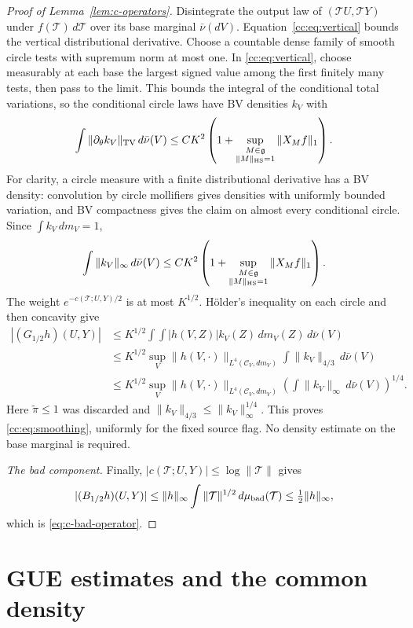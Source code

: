 \documentclass[11pt]{article}
\numberwithin{equation}{section}
\theoremstyle{remark}
\begin{document}
\begin{proof}[Proof of Lemma~\ref{lem:c-operators}]
Disintegrate the output law of $(\mathcal T U,\mathcal T Y)$ under $f(\mathcal T)\,d\mathcal T$ over
its base marginal $\bar\nu(dV)$. Equation~\eqref{cc:eq:vertical}
bounds the vertical distributional derivative. Choose a countable
dense family of smooth circle tests with supremum norm at most one.
In \eqref{cc:eq:vertical}, choose measurably at each base the largest
signed value among the first finitely many tests, then pass to the
limit. This bounds the integral of the conditional total variations,
so the conditional circle laws have BV densities $k_V$ with
\[
 \int\|\partial_\theta k_V\|_{\rm TV}\,d\bar\nu(V)
 \le CK^2\left(1+
 \sup_{\substack{M\in\mathfrak g\\\|M\|_{\rm HS}=1}}
                \|X_Mf\|_1\right).
\]
For clarity, a circle measure with a finite distributional derivative
has a BV density: convolution by circle mollifiers gives densities
with uniformly bounded variation, and BV compactness gives the
claim on almost every conditional circle. Since $\int k_V\,dm_V=1$,
\[
 \int\|k_V\|_\infty\,d\bar\nu(V)
 \le CK^2\left(1+
 \sup_{\substack{M\in\mathfrak g\\\|M\|_{\rm HS}=1}}
                \|X_Mf\|_1\right).
\]
The weight $e^{-c(\mathcal T;U,Y)/2}$ is at most $K^{1/2}$.
H\"older's inequality on each circle and then concavity give
\[
 \begin{aligned}
 |(G_{1/2}h)(U,Y)|
 &\le K^{1/2}\int\!\int |h(V,Z)|k_V(Z)\,dm_V(Z)\,d\bar\nu(V)\\
 &\le K^{1/2}\sup_V\|h(V,\cdot)\|_{L^4(\mathcal C_V,dm_V)}
           \int\|k_V\|_{4/3}\,d\bar\nu(V)\\
 &\le K^{1/2}\sup_V\|h(V,\cdot)\|_{L^4(\mathcal C_V,dm_V)}
           \left(\int\|k_V\|_\infty\,d\bar\nu(V)\right)^{1/4}.
 \end{aligned}
\]
Here $\widetilde{\pi}\le1$ was discarded and
$\|k_V\|_{4/3}\le\|k_V\|_\infty^{1/4}$.
This proves \eqref{cc:eq:smoothing}, uniformly for the fixed source
flag. No density estimate on the base marginal is required.

\medskip\noindent\emph{The bad component.}
Finally, $|c(\mathcal T;U,Y)|\le\log\|\mathcal T\|$ gives
\[
 |(B_{1/2}h)(U,Y)|
 \le\|h\|_\infty\int\|\mathcal T\|^{1/2}\,d\mu_{\rm bad}(\mathcal T)
 \le\tfrac12\|h\|_\infty,
\]
which is \eqref{eq:c-bad-operator}.
\end{proof}

\section{GUE estimates and the common density}
\label{app:upper-gue}
\end{document}
